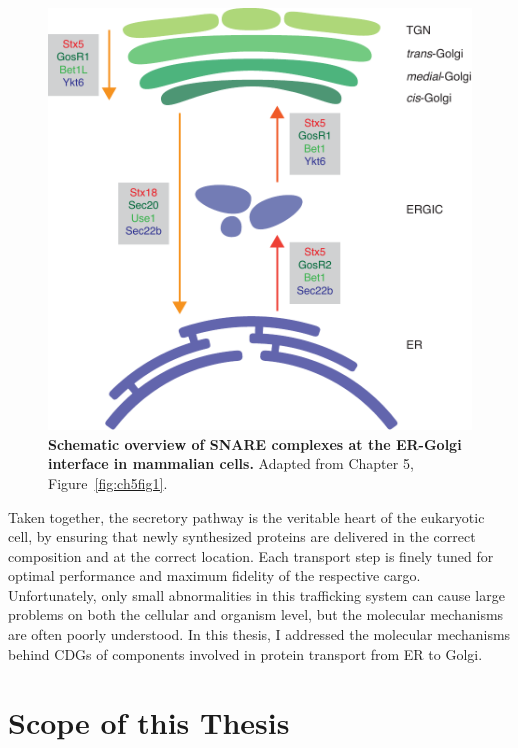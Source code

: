 \begin{figure}
    \includegraphics[keepaspectratio=true,width=\textwidth,height=\textheight]{chapters/chapter1/chapter1_Figure4.pdf}
    \caption{\textbf{Schematic overview of SNARE complexes at the ER-Golgi interface in mammalian cells.} Adapted from Chapter 5, Figure~\ref{fig:ch5fig1}.}
    \label{fig:ch1fig4}
\end{figure}

\vspace{\baselineskip}

Taken together, the secretory pathway is the veritable heart of the eukaryotic cell, by ensuring that newly synthesized proteins are delivered in the correct composition and at the correct location. Each transport step is finely tuned for optimal performance and maximum fidelity of the respective cargo. Unfortunately, only small abnormalities in this trafficking system can cause large problems on both the cellular and organism level, but the molecular mechanisms are often poorly understood. In this thesis, I addressed the molecular mechanisms behind CDGs of components involved in protein transport from ER to Golgi.

\clearpage

\section{Scope of this Thesis}

